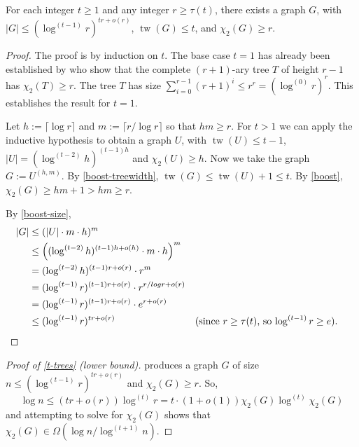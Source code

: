 \documentclass[kpfonts]{patmorin}
\DeclareMathOperator{\tw}{tw}
\newcommand{\trn}{\chi_2}
\theoremstyle{named}
\begin{document}
\begin{lem}\label{treewidth-lower-bound}
    For each integer $t\ge 1$ and any integer $r\ge \tau(t)$, there exists a graph $G$, with $|G|\le (\log^{(t-1)}r)^{tr + o(r)}$, $\tw(G)\le t$, and $\trn(G)\ge r$.
\end{lem}

\begin{proof}
    The proof is by induction on $t$.  The base case $t=1$ has already been established by \citet{karpas.neiman.ea:on} who show that the complete $(r+1)$-ary tree $T$ of height $r-1$ has $\trn(T)\ge r$.  The tree $T$ has size $\sum_{i=0}^{r-1} (r+1)^i \le r^r=(\log^{(0)}r)^{r}$.  This establishes the result for $t=1$.

    Let $h:=\lceil\log r\rceil$ and $m:=\lceil r/\log r\rceil$ so that $hm\ge r$.  For $t>1$ we can apply the inductive hypothesis to obtain a graph $U$,     with $\tw(U)\le t-1$, $|U|=(\log^{(t-2)} h)^{(t-1)h}$ and $\trn(U)\ge h$.
    Now we take the graph $G:=U^{(h,m)}$.  By \cref{boost-treewidth}, $\tw(G)\le \tw(U)+1\le t$.  By \cref{boost},
    $\trn(G)\ge hm+1 > hm \ge r$.

    By \cref{boost-size},
    \begin{align*}
        |G| & \le (|U|\cdot m\cdot h)^{m} \\
        & \le \left((\log^{(t-2)} h)^{(t-1)h + o(h)}\cdot m\cdot h\right)^{m} \\
        & = (\log^{(t-2)} h)^{(t-1)r + o(r)}\cdot r^{m} \\
        & = (\log^{(t-1)} r)^{(t-1)r + o(r)}\cdot r^{r/log r+o(r)} \\
        & = (\log^{(t-1)} r)^{(t-1)r + o(r)}\cdot e^{r+o(r)} \\
        & \le (\log^{(t-1)} r)^{tr + o(r)} & \text{(since $r\ge \tau(t)$, so $\log^{(t-1)} r\ge e$).} & \qedhere
    \end{align*}
\end{proof}

\begin{proof}[Proof of \cref{t-trees} (lower bound)]
     produces a graph $G$ of size $n \le (\log^{(t-1)} r)^{tr+o(r)}$ and $\trn(G)\ge r$.  So,
    \[  \log n \le (tr+o(r))\log^{(t)} r = t\cdot(1+o(1))\trn(G)\log^{(t)} \trn(G)\]
    and attempting to solve for $\trn(G)$ shows that $\trn(G)\in \Omega(\log n/\log^{(t+1)} n)$.
\end{proof}
\end{document}
